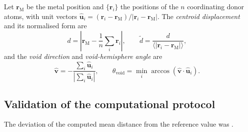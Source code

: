 Let $\mathbf{r}_{\mathrm{M}}$ be the metal position and $\{\mathbf{r}_i\}$ the positions of the
$n$ coordinating donor atoms, with unit vectors
$\hat{\mathbf{u}}_i = (\mathbf{r}_i - \mathbf{r}_{\mathrm{M}})/|\mathbf{r}_i - \mathbf{r}_{\mathrm{M}}|$.
The \emph{centroid displacement} and its normalised form are
\begin{equation}
  d = \left| \mathbf{r}_{\mathrm{M}} - \frac{1}{n}\sum_{i} \mathbf{r}_i \right|,
  \qquad
  \tilde{d} = \frac{d}{\langle |\mathbf{r}_i - \mathbf{r}_{\mathrm{M}}| \rangle},
  \label{eq:displacement}
\end{equation}
and the \emph{void direction} and \emph{void-hemisphere angle} are
\begin{equation}
  \hat{\mathbf{v}} = -\frac{\sum_i \hat{\mathbf{u}}_i}{\left|\sum_i \hat{\mathbf{u}}_i\right|},
  \qquad
  \theta_{\mathrm{void}} = \min_i \arccos\!\left(\hat{\mathbf{v}} \cdot \hat{\mathbf{u}}_i\right).
  \label{eq:voidangle}
\end{equation}

\subsection{Validation of the computational protocol}
\label{sec:validation}
The deviation of the computed mean  distance from the reference value was
.
